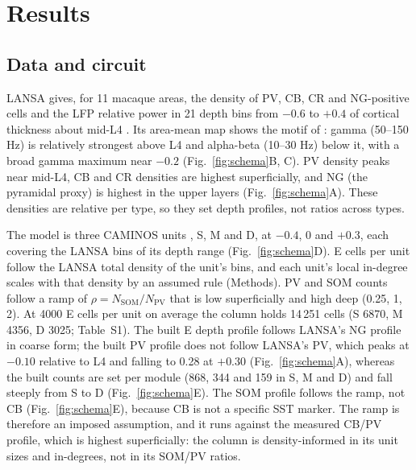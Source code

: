 \section{Results}


\subsection{Data and circuit}

LANSA gives, for 11 macaque areas, the density of PV, CB, CR and NG-positive cells and the LFP relative power in
21 depth bins from $-0.6$ to $+0.4$ of cortical thickness about mid-L4 \citep{Mulvey2024}. Its area-mean map
shows the motif of \citet{MendozaHalliday2024}: gamma (50--150 Hz) is relatively strongest above L4 and
alpha-beta (10--30 Hz) below it, with a broad gamma maximum near $-0.2$ (Fig.~\ref{fig:schema}B, C).
PV density peaks near mid-L4, CB and CR densities are highest superficially, and NG (the pyramidal proxy) is
highest in the upper layers (Fig.~\ref{fig:schema}A). These densities are relative per type, so they set depth
profiles, not ratios across types.

The model is three CAMINOS units \citep{Tahvili2025,Tahvili2026}, S, M and D, at $-0.4$, 0 and $+0.3$, each covering
the LANSA bins of its depth range (Fig.~\ref{fig:schema}D). E cells per unit follow the LANSA total density of
the unit's bins, and each unit's local in-degree scales with that density by an assumed rule (Methods). PV and SOM
counts follow a ramp of $\rho = N_\text{SOM}/N_\text{PV}$ that is low superficially and high deep (0.25, 1, 2). At
4000 E cells per unit on average the column holds 14\,251 cells (S 6870, M 4356, D 3025; Table~S1). The built E
depth profile follows LANSA's NG profile in coarse form; the built PV profile does not follow LANSA's PV, which peaks
at $-0.10$ relative to L4 and falling to 0.28 at $+0.30$ (Fig.~\ref{fig:schema}A), whereas the built counts are set per module (868, 344 and 159 in S, M and D)
and fall steeply from S to D (Fig.~\ref{fig:schema}E). The SOM profile follows the ramp, not
CB (Fig.~\ref{fig:schema}E), because CB is not a specific SST marker. The ramp is therefore an imposed assumption,
and it runs against the measured CB/PV profile, which is highest superficially: the column is density-informed in
its unit sizes and in-degrees, not in its SOM/PV ratios.

